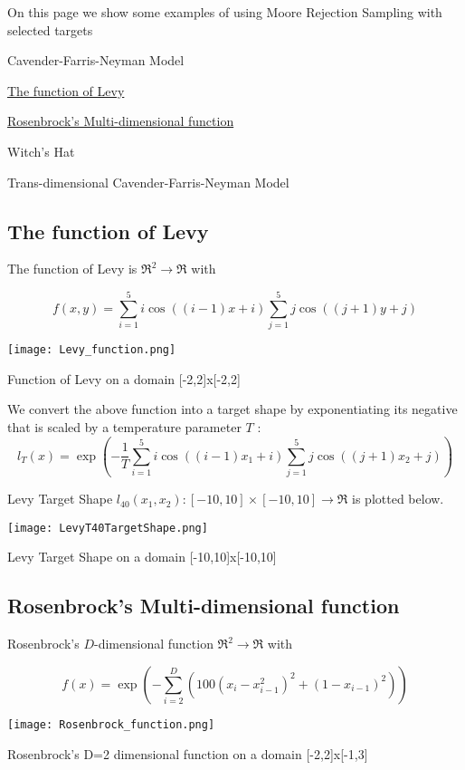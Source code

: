 \-On this page we show some examples of using \-Moore \-Rejection \-Sampling with selected targets


\begin{DoxyItemize}
\item \-Cavender-\/\-Farris-\/\-Neyman \-Model
\item \hyperlink{target_examples_MRSexamsec_Levy}{\-The function of \-Levy}
\item \hyperlink{target_examples_MRSexamsec_Rosenbrock}{\-Rosenbrock's \-Multi-\/dimensional function}
\item \-Witch's \-Hat
\item \-Trans-\/dimensional \-Cavender-\/\-Farris-\/\-Neyman \-Model
\end{DoxyItemize}\hypertarget{target_examples_MRSexamsec_Levy}{}\subsection{\-The function of Levy}\label{target_examples_MRSexamsec_Levy}
\-The function of \-Levy is $ \Re^2 \rightarrow \Re $ with

\[ f(x,y) = \sum_{i=1}^5 i \cos((i - 1)x + i)\sum_{j=1}^5j\cos((j + 1)y + j) \]

 
\begin{DoxyImage}
\texttt{[image: Levy\_function.png]}
\caption{\-Function of \-Levy on a domain \mbox{[}-\/2,2\mbox{]}x\mbox{[}-\/2,2\mbox{]}}
\end{DoxyImage}


\-We convert the above function into a target shape by exponentiating its negative that is scaled by a temperature parameter $T$ \-: \[ l_{T}(x) = \exp \left( - \frac{1}{T}\sum_{i=1}^5 i \cos((i - 1)x_1 + i) \sum_{j=1}^5j\cos((j + 1)x_2 + j) \right) \]

\-Levy \-Target \-Shape $l_{40}(x_1,x_2): [-10,10]\times [-10,10] \to \Re $ is plotted below.

 
\begin{DoxyImage}
\texttt{[image: LevyT40TargetShape.png]}
\caption{\-Levy \-Target \-Shape on a domain \mbox{[}-\/10,10\mbox{]}x\mbox{[}-\/10,10\mbox{]}}
\end{DoxyImage}
\hypertarget{target_examples_MRSexamsec_Rosenbrock}{}\subsection{\-Rosenbrock's Multi-\/dimensional function}\label{target_examples_MRSexamsec_Rosenbrock}
\-Rosenbrock's $ D $-\/dimensional function $ \Re^2 \rightarrow \Re $ with

\[ f(x) = \exp \left( - \sum_{i=2}^D \left( 100(x_i - x_{i-1}^2)^2 + ( 1 - x_{i-1})^2 \right) \right) \]

 
\begin{DoxyImage}
\texttt{[image: Rosenbrock\_function.png]}
\caption{\-Rosenbrock's \-D=2 dimensional function on a domain \mbox{[}-\/2,2\mbox{]}x\mbox{[}-\/1,3\mbox{]}}
\end{DoxyImage}
 